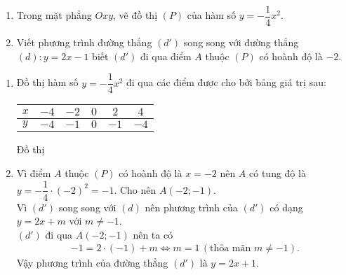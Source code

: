 \begin{ex}%
 \begin{enumerate}
  \item Trong mặt phẳng $Oxy$, vẽ đồ thị $(P)$ của hàm số $y = -\dfrac{1}{4}x^2$.
  \item Viết phương trình đường thẳng $(d')$ song song với đường thẳng $(d): y = 2x - 1$ biết $(d')$ đi qua điểm $A$ thuộc $(P)$ có hoành độ là $-2$.
 \end{enumerate}
 \loigiai
  {
  \begin{enumerate}
   \item Đồ thị hàm số $y = -\dfrac{1}{4}x^2$ đi qua các điểm được cho bởi bảng giá trị sau:
   \begin{center}
      \begin{tabular}{| p{} | c | c | c | c | c |} \hline
       $x$ & $-4$ & $-2$ & $0$ & $2$ & $4$ \\ \hline
       $y$ & $-4$ & $-1$ & $0$ & $-1$ & $-4$ \\ \hline
      \end{tabular}
   \end{center}
   Đồ thị
   \begin{center}
   \end{center}
   \item Vì điểm $A$ thuộc $(P)$ có hoành độ là $x= -2$ nên $A$ có tung độ là $y = -\dfrac{1}{4}\cdot (-2)^2 = -1$. Cho nên $A(-2;-1)$.\\
   Vì $(d')$ song song với $(d)$ nên phương trình của $(d')$ có dạng $y = 2x + m$ với $m \neq -1$.\\
   $(d')$ đi qua $A(-2;-1)$ nên ta có
   \begin{align*}
    -1 = 2 \cdot (-1) + m \Leftrightarrow m = 1 \, (\textrm{thỏa mãn } m \neq -1).
   \end{align*}
   Vậy phương trình của đường thẳng $(d')$ là $y = 2x + 1$.
  \end{enumerate}
  }
\end{ex}


